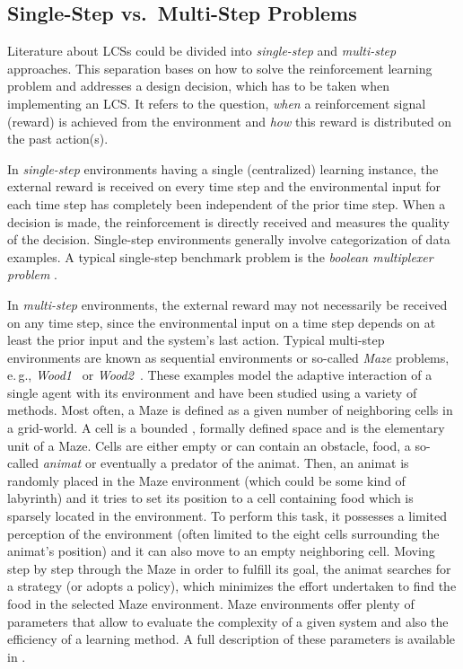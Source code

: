 \subsection{Single-Step vs.\ Multi-Step Problems}
\label{subsection:single-step-vs-multi-step-problems}

Literature about LCSs could be divided into \emph{single-step} and \emph{mul\-ti-step} approaches. This separation bases on how to solve the reinforcement learning problem and addresses a design decision, which has to be taken when implementing an LCS. It refers to the question, \emph{when} a reinforcement signal (reward) is achieved from the environment and \emph{how} this reward is distributed on the past action(s). 

In \emph{single-step} environments having a single (centralized) learning instance, the external reward is received on every time step and the environmental input for each time step has completely been independent of the prior time step. %
When a decision is made, the reinforcement is directly received and measures the quality of the decision. Single-step environments generally involve categorization of data examples. A typical single-step benchmark problem is the \emph{boolean multiplexer problem} \cite{BKLW04,Wil95}. 

In \emph{multi-step} environments, the external reward may not necessarily be received on any time step, since the environmental input on a time step depends on at least the prior input and the system's last action. Typical multi-step environments are known as sequential environments or so-called \emph{Maze} problems, e.\,g., \emph{Wood1}~\cite{Wil94} or \emph{Wood2}~\cite{Wil95}. These examples model the adaptive interaction of a single agent with its environment and have been studied using a variety of methods. Most often, a Maze is defined as a given number of neighboring cells in a grid-world. A cell is a bounded %
, formally defined space
and is the elementary unit of a Maze. Cells are either empty or can contain an obstacle, food, a so-called \emph{animat} or eventually a predator of the animat. Then, an animat is randomly placed in the Maze environment (which could be some kind of labyrinth) and it tries to set its position to a cell containing food which is sparsely located in the environment. To perform this task, it possesses a limited perception of the environment (often limited to the eight cells surrounding the animat's position) and it can also move to an empty neighboring cell. Moving step by step through the Maze in order to fulfill its goal, the animat searches for a strategy (or adopts a policy), which minimizes the effort undertaken to find the food in the selected Maze environment. Maze environments offer plenty of parameters that allow to evaluate the complexity of a given system and also 
the efficiency of a learning method. A full description of these parameters is available in \cite{BZ05}.


